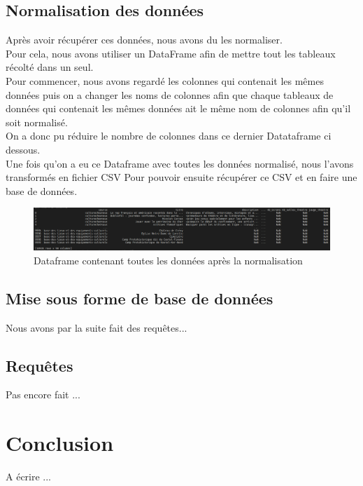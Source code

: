 \documentclass{article}
\begin{document}
\subsection{Normalisation des données}
Après avoir récupérer ces données, nous avons du les normaliser.\\
Pour cela, nous avons utiliser un DataFrame afin de mettre tout les tableaux récolté dans un seul.\\
Pour commencer, nous avons regardé les colonnes qui contenait les mêmes données puis on a changer les noms de colonnes afin que chaque tableaux de données qui contenait les mêmes données ait le même nom de colonnes afin qu'il soit normalisé.\\
On a donc pu réduire le nombre de colonnes dans ce dernier Datataframe ci dessous.\\
Une fois qu'on a eu ce Dataframe avec toutes les données normalisé, nous l'avons transformés en fichier CSV Pour pouvoir ensuite récupérer ce CSV et en faire une base de données.
\begin{figure}[H]
\hspace{-25mm}
\includegraphics[scale = 0.35]{images/dataframe_final.png}
\caption{Dataframe contenant toutes les données après la normalisation}
\end{figure}

\subsection{Mise sous forme de base de données}
Nous avons par la suite fait des requêtes...

\subsection{Requêtes}
Pas encore fait ...

\section{Conclusion}
A écrire ...
\end{document}

